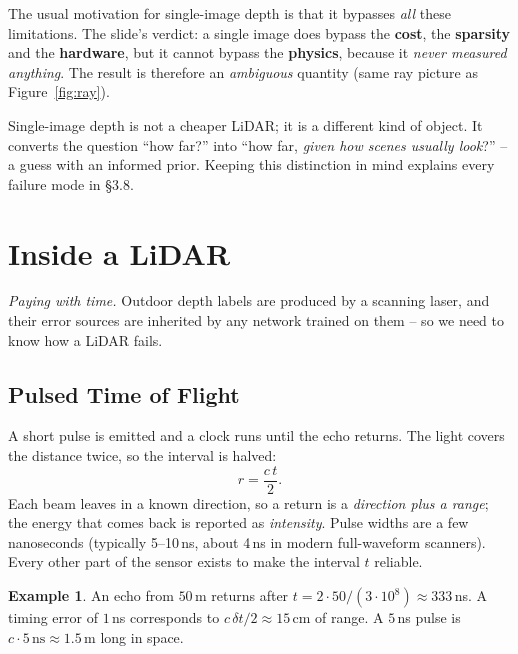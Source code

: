 \documentclass[11pt,a4paper]{article}
\theoremstyle{definition}
\newtheorem{example}[definition]{Example}
\theoremstyle{plain}
\theoremstyle{remark}
\begin{document}
The usual motivation for single-image depth is that it bypasses \emph{all} these limitations. The slide's verdict: a single image does bypass the \textbf{cost}, the \textbf{sparsity} and the \textbf{hardware}, but it cannot bypass the \textbf{physics}, because it \emph{never measured anything}. The result is therefore an \emph{ambiguous} quantity (same ray picture as Figure~\ref{fig:ray}).
 
\begin{intuition}
Single-image depth is not a cheaper LiDAR; it is a different kind of object. It converts the question ``how far?'' into ``how far, \emph{given how scenes usually look}?'' -- a guess with an informed prior. Keeping this distinction in mind explains every failure mode in \S3.8.
\end{intuition}
 
\section{Inside a LiDAR }
\emph{Paying with time.} Outdoor depth labels are produced by a scanning laser, and their error sources are inherited by any network trained on them -- so we need to know how a LiDAR fails.
 
\subsection{Pulsed Time of Flight }
 
A short pulse is emitted and a clock runs until the echo returns. The light covers the distance twice, so the interval is halved:
\begin{equation}\label{eq:tof}
r=\frac{c\,t}{2}.
\end{equation}
Each beam leaves in a known direction, so a return is a \emph{direction plus a range}; the energy that comes back is reported as \emph{intensity}. Pulse widths are a few nanoseconds (typically 5--10\,ns, about 4\,ns in modern full-waveform scanners). Every other part of the sensor exists to make the interval $t$ reliable.
 
\begin{example}
An echo from $50$\,m returns after $t=2\cdot 50/(3\cdot10^8)\approx 333$\,ns. A timing error of $1$\,ns corresponds to $c\,\delta t/2\approx 15$\,cm of range. A $5$\,ns pulse is $c\cdot 5\,\text{ns}\approx1.5$\,m long in space.
\end{example}
 
\end{document}

